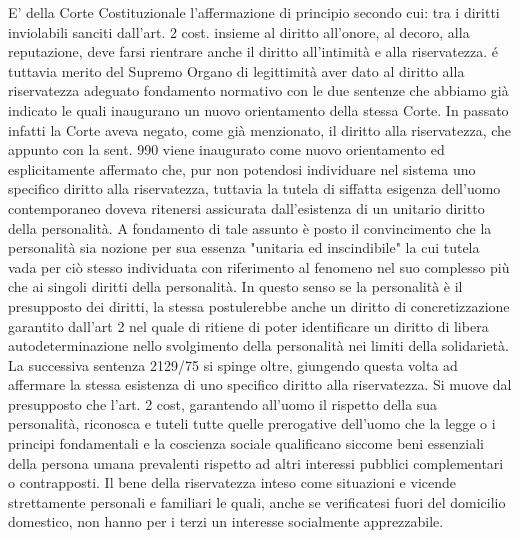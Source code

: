 E' della Corte Costituzionale l'affermazione di principio secondo cui: tra i diritti inviolabili sanciti dall'art. 2 cost. insieme al diritto all'onore, al decoro, alla reputazione, deve farsi rientrare anche il diritto all'intimità e alla riservatezza. é tuttavia merito del Supremo Organo di legittimità aver dato al diritto alla riservatezza adeguato fondamento normativo con le due sentenze che abbiamo già indicato le quali inaugurano un nuovo orientamento della stessa Corte.
In passato infatti la Corte aveva negato, come già menzionato, il diritto alla riservatezza, che appunto con la sent. 990 viene inaugurato come nuovo orientamento ed esplicitamente affermato che, pur non potendosi individuare nel sistema uno specifico diritto alla riservatezza, tuttavia la tutela di siffatta esigenza dell'uomo contemporaneo doveva ritenersi assicurata dall'esistenza di un unitario diritto della personalità. A fondamento di tale assunto è posto il convincimento che la personalità sia nozione per sua essenza "unitaria ed inscindibile" la cui tutela vada per ciò stesso individuata con riferimento al fenomeno nel suo complesso più che ai singoli diritti della personalità. 
In questo senso se la personalità è il presupposto dei diritti, la stessa postulerebbe anche un diritto di concretizzazione garantito dall'art 2 nel quale di ritiene di poter identificare un diritto di libera autodeterminazione nello svolgimento della personalità nei limiti della solidarietà.
La successiva sentenza 2129/75 si spinge oltre, giungendo questa volta ad affermare la stessa esistenza di uno specifico diritto alla riservatezza.
Si muove dal presupposto che l'art. 2 cost, garantendo all'uomo il rispetto della sua personalità, riconosca e tuteli tutte quelle prerogative dell'uomo che la legge o i principi fondamentali e la coscienza sociale qualificano siccome beni essenziali della persona umana prevalenti rispetto ad altri interessi pubblici complementari o contrapposti. Il bene della riservatezza inteso come situazioni e vicende strettamente personali e familiari le quali, anche se verificatesi fuori del domicilio domestico, non hanno per i terzi un interesse socialmente apprezzabile.

